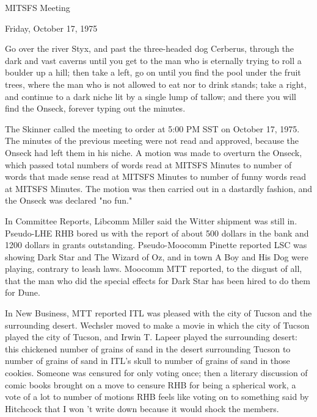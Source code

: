 \documentclass[12pt]{article}
\begin{document}
\begin{center}

MITSFS Meeting

Friday, October 17, 1975

\end{center}
 
\vspace{12pt}

\setlength{\parskip}{6pt}

\noindent
Go over the river Styx, and past the three-headed dog Cerberus, through the dark and vast caverns until you get to the man who is eternally trying to roll a boulder up a hill; then take a left, go on until you find the pool under the fruit trees, where the man who is not allowed to eat nor to drink stands; take a right, and continue to a dark niche lit by a single lump of tallow; and there you will find the Onseck, forever typing out the minutes.

The Skinner called the meeting to order at 5:00 PM SST on October 17, 1975. The minutes of the previous meeting were not read and approved, because the Onseck had left them in his niche. A motion was made to overturn the Onseck, which passed total numbers of words read at MITSFS Minutes to number of words that made sense read at MITSFS Minutes to number of funny words read at MITSFS Minutes. The motion was then carried out in a dastardly fashion, and the Onseck was declared "no fun."

In Committee Reports, Libcomm Miller said the Witter shipment was still in. Pseudo-LHE RHB bored us with the report of about 500 dollars in the bank and 1200 dollars in grants outstanding. Pseudo-Moocomm Pinette reported LSC was showing Dark Star and The Wizard of Oz, and in town A Boy and His Dog were playing, contrary to leash laws. Moocomm MTT reported, to the disgust of all, that the man who did the special effects for Dark Star has been hired to do them for Dune.

In New Business, MTT reported ITL was pleased with the city of Tucson and the surrounding desert. Wechsler moved to make a movie in which the city of Tucson played the city of Tucson, and Irwin T. Lapeer played the surrounding desert: this chickened number of grains of sand in the desert surrounding Tucson to number of grains of sand in ITL's skull to number of grains of sand in those cookies. Someone was censured for only voting once; then a literary discussion of comic books brought on a move to censure RHB for being a spherical work, a vote of a lot to number of motions RHB feels like voting on to something said by Hitchcock that I won 't write down because it would shock the members.
\end{document}
